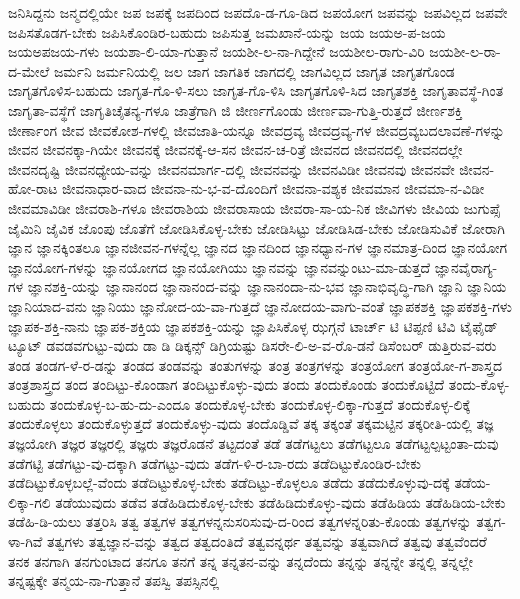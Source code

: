 {ಜನಿಸಿದ್ದನು
ಜನ್ಮದಲ್ಲಿಯೇ
ಜಪ
ಜಪಕ್ಕೆ
ಜಪದಿಂದ
ಜಪದೊ-ಡ-ಗೂ-ಡಿದ
ಜಪಯೋಗ
ಜಪವನ್ನು
ಜಪವಿಲ್ಲದ
ಜಪವೇ
ಜಪಿಸತೊಡಗ-ಬೇಕು
ಜಪಿಸಿಕೊಂಡಿರ-ಬಹುದು
ಜಪಿಸುತ್ತ
ಜಮಖಾನೆ-ಯನ್ನು
ಜಯ
ಜಯಅ-ಪ-ಜಯ
ಜಯಅಪಜಯ-ಗಳು
ಜಯಶಾ-ಲಿ-ಯಾ-ಗುತ್ತಾನೆ
ಜಯಶೀ-ಲ-ನಾ-ಗಿದ್ದೇನೆ
ಜಯಶೀಲ-ರಾಗು-ವಿರಿ
ಜಯಶೀ-ಲ-ರಾ-ದ-ಮೇಲೆ
ಜರ್ಮನಿ
ಜರ್ಮನಿಯಲ್ಲಿ
ಜಲ
ಜಾಗ
ಜಾಗತಿಕ
ಜಾಗದಲ್ಲಿ
ಜಾಗವಿಲ್ಲದ
ಜಾಗೃತ
ಜಾಗೃತಗೊಂಡ
ಜಾಗೃತಗೊಳಿಸ-ಬಹುದು
ಜಾಗೃತ-ಗೊ-ಳಿ-ಸಲು
ಜಾಗೃತ-ಗೊ-ಳಿಸಿ
ಜಾಗೃತಗೊಳಿ-ಸಿದ
ಜಾಗೃತಶಕ್ತಿ
ಜಾಗೃತಾವಸ್ಥೆ-ಗಿಂತ
ಜಾಗೃತಾ-ವಸ್ಥೆಗೆ
ಜಾಗೃತಿಚೈತನ್ಯ-ಗಳೂ
ಜಾತ್ರೆಗಾಗಿ
ಜಿ
ಜೀರ್ಣಗೊಂಡು
ಜೀರ್ಣವಾ-ಗುತ್ತಿ-ರುತ್ತದೆ
ಜೀರ್ಣಶಕ್ತಿ
ಜೀರ್ಣಾಂಗ
ಜೀವ
ಜೀವಕೋಶ-ಗಳಲ್ಲಿ
ಜೀವಜಾತಿ-ಯನ್ನೂ
ಜೀವದ್ರವ್ಯ
ಜೀವದ್ರವ್ಯ-ಗಳ
ಜೀವದ್ರವ್ಯಬದಲಾವಣೆ-ಗಳನ್ನು
ಜೀವನ
ಜೀವನಕ್ಕಾ-ಗಿಯೇ
ಜೀವನಕ್ಕೆ
ಜೀವನಕ್ಕೆ-ಆ-ಸನ
ಜೀವನ-ಚ-ರಿತ್ರೆ
ಜೀವನದ
ಜೀವನದಲ್ಲಿ
ಜೀವನದಲ್ಲೇ
ಜೀವನದೃಷ್ಟಿ
ಜೀವನಧ್ಯೇಯ-ವನ್ನು
ಜೀವನಮಾರ್ಗ-ದಲ್ಲಿ
ಜೀವನವನ್ನು
ಜೀವನವಿಡೀ
ಜೀವನವು
ಜೀವನವೇ
ಜೀವನ-ಹೋ-ರಾಟ
ಜೀವನಾಧಾರ-ವಾದ
ಜೀವನಾ-ನು-ಭ-ವ-ದೊಂದಿಗೆ
ಜೀವನಾ-ವಶ್ಯಕ
ಜೀವಮಾನ
ಜೀವಮಾ-ನ-ವಿಡೀ
ಜೀವಮಾವಿಡೀ
ಜೀವರಾಶಿ-ಗಳೂ
ಜೀವರಾಶಿಯ
ಜೀವರಾಸಾಯ
ಜೀವರಾ-ಸಾ-ಯ-ನಿಕ
ಜೀವಿಗಳು
ಜೀವಿಯ
ಜುಗುಪ್ಸೆ
ಜೈಮಿನಿ
ಜೈವಿಕ
ಜೊಂಪು
ಜೊತೆಗೆ
ಜೋಡಿಸಿಕೊಳ್ಳ-ಬೇಕು
ಜೋಡಿಸಿಟ್ಟು
ಜೋಡಿಸಿಡ-ಬೇಕು
ಜೋಡಿಸುವಿಕೆ
ಜೋರಾಗಿ
ಜ್ಞಾನ
ಜ್ಞಾನಕ್ಕಿಂತಲೂ
ಜ್ಞಾನಜೀವನ-ಗಳನ್ನೆಲ್ಲ
ಜ್ಞಾನದ
ಜ್ಞಾನದಿಂದ
ಜ್ಞಾನಧ್ಯಾನ-ಗಳ
ಜ್ಞಾನಮಾತ್ರ-ದಿಂದ
ಜ್ಞಾನಯೋಗ
ಜ್ಞಾನಯೋಗ-ಗಳನ್ನು
ಜ್ಞಾನಯೋಗದ
ಜ್ಞಾನಯೋಗಿಯು
ಜ್ಞಾನವನ್ನು
ಜ್ಞಾನವನ್ನುಂಟು-ಮಾ-ಡುತ್ತದೆ
ಜ್ಞಾನವೈರಾಗ್ಯ-ಗಳ
ಜ್ಞಾನಶಕ್ತಿ-ಯನ್ನು
ಜ್ಞಾನಾನಂದ
ಜ್ಞಾನಾನಂದ-ವನ್ನು
ಜ್ಞಾನಾನಂದಾ-ನು-ಭವ
ಜ್ಞಾನಾಭಿವೃದ್ಧಿ-ಗಾಗಿ
ಜ್ಞಾನಿ
ಜ್ಞಾನಿಯ
ಜ್ಞಾನಿಯಾದ-ವನು
ಜ್ಞಾನಿಯು
ಜ್ಞಾನೋದ-ಯ-ವಾ-ಗುತ್ತದೆ
ಜ್ಞಾನೋದಯ-ವಾಗು-ವಂತೆ
ಜ್ಞಾಪಕಶಕ್ತಿ
ಜ್ಞಾಪಕಶಕ್ತಿ-ಗಳು
ಜ್ಞಾಪಕ-ಶಕ್ತಿ-ನಾನು
ಜ್ಞಾಪಕ-ಶಕ್ತಿಯ
ಜ್ಞಾಪಕಶಕ್ತಿ-ಯನ್ನು
ಜ್ಞಾಪಿಸಿಕೊಳ್ಳ
ಝಗ್ಗನೆ
ಟಾರ್ಚ್
ಟಿ
ಟಿಪ್ಪಣಿ
ಟಿವಿ
ಟೈಫೈಡ್
ಟ್ಯೂಟ್
ಡವಡವಗುಟ್ಟು-ವುದು
ಡಾ
ಡಿ
ಡಿಕ್ಕನ್ಸ್
ಡಿಗ್ರಿಯಷ್ಟು
ಡಿಸರೇ-ಲಿ-ಅ-ವ-ರೊ-ಡನೆ
ಡಿಸೆಂಬರ್
ಡುತ್ತಿರುವ-ವರು
ತಂಡ
ತಂಡಗ-ಳೆ-ರ-ಡನ್ನು
ತಂಡದ
ತಂಡವನ್ನು
ತಂತುಗಳನ್ನು
ತಂತ್ರ
ತಂತ್ರಗಳನ್ನು
ತಂತ್ರಯೋಗ
ತಂತ್ರಯೋ-ಗ-ಶಾಸ್ತ್ರದ
ತಂತ್ರಶಾಸ್ತ್ರದ
ತಂದ
ತಂದಿಟ್ಟು-ಕೊಂಡಾಗ
ತಂದಿಟ್ಟುಕೊಳ್ಳು-ವುದು
ತಂದು
ತಂದುಕೊಂಡು
ತಂದುಕೊಟ್ಟಿದೆ
ತಂದು-ಕೊಳ್ಳ-ಬಹುದು
ತಂದುಕೊಳ್ಳ-ಬ-ಹು-ದು-ಎಂದೂ
ತಂದುಕೊಳ್ಳ-ಬೇಕು
ತಂದುಕೊಳ್ಳ-ಲಿಕ್ಕಾ-ಗುತ್ತದೆ
ತಂದುಕೊಳ್ಳ-ಲಿಕ್ಕೆ
ತಂದುಕೊಳ್ಳಲು
ತಂದುಕೊಳ್ಳುತ್ತದೆ
ತಂದುಕೊಳ್ಳು-ವುದು
ತಂದೊಡ್ಡಿವೆ
ತಕ್ಕ
ತಕ್ಕಂತೆ
ತಕ್ಕಮಟ್ಟಿನ
ತಕ್ಕರೀತಿ-ಯಲ್ಲಿ
ತಜ್ಞ
ತಜ್ಞಯೋಗಿ
ತಜ್ಞರ
ತಜ್ಞರಲ್ಲಿ
ತಜ್ಞರು
ತಜ್ಞರೊಡನೆ
ತಟ್ಟದಂತೆ
ತಡೆ
ತಡೆಗಟ್ಟಲು
ತಡೆಗಟ್ಟಲೂ
ತಡೆಗಟ್ಟಲ್ಪಟ್ಟಂತಾ-ದುವು
ತಡೆಗಟ್ಟಿ
ತಡೆಗಟ್ಟು-ವು-ದಕ್ಕಾಗಿ
ತಡೆಗಟ್ಟು-ವುದು
ತಡೆಗ-ಳಿ-ರ-ಬಾ-ರದು
ತಡೆದಿಟ್ಟುಕೊಂಡಿರ-ಬೇಕು
ತಡೆದಿಟ್ಟುಕೊಳ್ಳಬಲ್ಲೆ-ವೆಂದು
ತಡೆದಿಟ್ಟುಕೊಳ್ಳ-ಬೇಕು
ತಡೆದಿಟ್ಟು-ಕೊಳ್ಳಲೂ
ತಡೆದು
ತಡೆದುಕೊಳ್ಳುವು-ದಕ್ಕೆ
ತಡೆಯ-ಲಿಕ್ಕಾ-ಗಲಿ
ತಡೆಯುವುದು
ತಡೆವ
ತಡೆಹಿಡಿದುಕೊಳ್ಳ-ಬೇಕು
ತಡೆಹಿಡಿದುಕೊಳ್ಳು-ವುದು
ತಡೆಹಿಡಿಯ
ತಡೆಹಿಡಿಯ-ಬೇಕು
ತಡೆಹಿ-ಡಿ-ಯಲು
ತತ್ತರಿಸಿ
ತತ್ವ
ತತ್ವಗಳ
ತತ್ವಗಳನ್ನನುಸರಿಸುವು-ದ-ರಿಂದ
ತತ್ವಗಳನ್ನರಿತು-ಕೊಂಡು
ತತ್ವಗಳನ್ನು
ತತ್ವಗ-ಳಾ-ಗಿವೆ
ತತ್ವಗಳು
ತತ್ವಜ್ಞಾನ-ವನ್ನು
ತತ್ವದ
ತತ್ವದಂತಿದೆ
ತತ್ವವನ್ನರ್ಥ
ತತ್ವವನ್ನು
ತತ್ವವಾಗಿದೆ
ತತ್ವವು
ತತ್ವವೆಂದರೆ
ತನಕ
ತನಗಾಗಿ
ತನಗುಂಟಾದ
ತನಗೂ
ತನಗೆ
ತನ್ನ
ತನ್ನತನ-ವನ್ನು
ತನ್ನದೆಂದು
ತನ್ನನ್ನು
ತನ್ನನ್ನೇ
ತನ್ನಲ್ಲಿ
ತನ್ನಲ್ಲೇ
ತನ್ನಷ್ಟಕ್ಕೇ
ತನ್ಮಯ-ನಾ-ಗುತ್ತಾನೆ
ತಪಸ್ವಿ
ತಪಸ್ಸಿನಲ್ಲಿ
}

